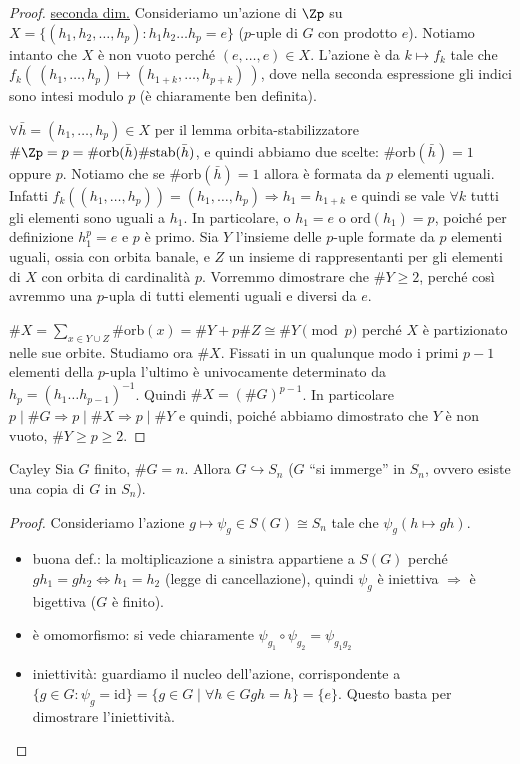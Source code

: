 \begin{proof}
\underline{seconda dim.}
    Consideriamo un'azione di $\Zp$ su $X = \{ (h_1,h_2,\dots,h_p) : h_1h_2\dots h_p = e \}$ ($p$-uple di $G$ con prodotto $e$). Notiamo intanto che $X$ è non vuoto perché $(e,\dots, e) \in X$. L'azione è da $k \mapsto f_k$ tale che $f_k(\ (h_1,\dots,h_p) \mapsto (h_{1+k},\dots,h_{p+k}) \ )$, dove nella seconda espressione gli indici sono intesi modulo $p$ (è chiaramente ben definita).
    
    $\forall \bar h = (h_1,\dots,h_p) \in X$ per il lemma orbita-stabilizzatore $\#\Zp = p = \#\text{orb}(\bar h) \#\text{stab}(\bar h)$, e quindi abbiamo due scelte: $ \#\text{orb}(\bar h) = 1$ oppure $p$. Notiamo che se $\#\text{orb}( \bar h ) = 1$ allora è formata da $p$ elementi uguali. Infatti $f_k( (h_1,\dots,h_p) ) = (h_1,\dots,h_p) \Rightarrow h_1 = h_{1+k}$ e quindi se vale $\forall k$ tutti gli elementi sono uguali a $h_1$. In particolare, o $h_1 = e$ o $\text{ord}(h_1) = p$, poiché per definizione $h_1^p = e$ e $p$ è primo. Sia $Y$ l'insieme delle $p$-uple formate da $p$ elementi uguali, ossia con orbita banale, e $Z$ un insieme di rappresentanti per gli elementi di $X$ con orbita di cardinalità $p$. Vorremmo dimostrare che $\#Y \geq 2$, perché così avremmo una $p$-upla di tutti elementi uguali e diversi da $e$.
    
    $\#X = \sum_{x \in Y \cup Z} \#\text{orb}(x) = \#Y + p\#Z \cong \#Y \pmod{p}$ perché $X$ è partizionato nelle sue orbite. Studiamo ora $\#X$. Fissati in un qualunque modo i primi $p-1$ elementi della $p$-upla l'ultimo è univocamente determinato da $h_p = (h_1\dots h_{p-1})^{-1}$. Quindi $\# X = (\#G)^{p-1}$. In particolare $p \mid \#G \Rightarrow p \mid \#X \Rightarrow p \mid \#Y$ e quindi, poiché abbiamo dimostrato che $Y$ è non vuoto, $\#Y \geq p \geq 2$.
\end{proof}
\begin{theorem}{Cayley}
    Sia $G$ finito, $\#G = n$. Allora $G \hookrightarrow S_n$ ($G$ ``si immerge'' in $S_n$, ovvero esiste una copia di $G$ in $S_n$).
\end{theorem}
\begin{proof}
    Consideriamo l'azione $g \mapsto \psi_g \in S(G) \cong S_n$ tale che $\psi_g(h \mapsto gh)$.
    \begin{itemize}
        \item buona def.: la moltiplicazione a sinistra appartiene a $S(G)$ perché $gh_1 = gh_2 \iff h_1 = h_2$ (legge di cancellazione), quindi $\psi_g$ è iniettiva $\Rightarrow$ è bigettiva ($G$ è finito).
        \item è omomorfismo: si vede chiaramente $\psi_{g_1} \circ \psi_{g_2} = \psi_{g_1g_2}$
        \item iniettività: guardiamo il nucleo dell'azione, corrispondente a $\{g \in G : \psi_g = \text{id}\} = \{g \in G \mid \forall h \in G gh = h \} = \{e\}$. Questo basta per dimostrare l'iniettività.
    \end{itemize}
\end{proof}
